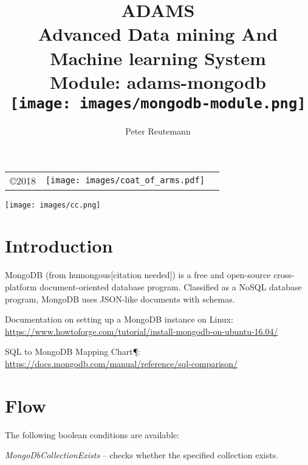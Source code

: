 \documentclass[a4paper]{book}
\title{
  \textbf{ADAMS} \\
  {\Large \textbf{A}dvanced \textbf{D}ata mining \textbf{A}nd \textbf{M}achine
  learning \textbf{S}ystem} \\
  {\Large Module: adams-mongodb} \\
  \vspace{1cm}
  \texttt{[image: images/mongodb-module.png]} \\
}
\author{
  Peter Reutemann
}
\begin{document}
\begin{titlepage}
\maketitle

\thispagestyle{empty}
\center
\begin{table}[b]
	\begin{tabular}{c l l}
		\parbox[c][2cm]{2cm}{\copyright 2018} &
		\parbox[c][2cm]{5cm}{\texttt{[image: images/coat\_of\_arms.pdf]}} \\
	\end{tabular}
	\texttt{[image: images/cc.png]} \\
\end{table}

\end{titlepage}

\tableofcontents

\chapter{Introduction}
MongoDB (from humongous[citation needed]) is a free and open-source cross-platform
document-oriented database program. Classified as a NoSQL\cite{nosql} database program,
MongoDB uses JSON-like\cite{json} documents with schemas.

\begin{tight_itemize}
  \item Documentation on setting up a MongoDB instance on Linux: \\
    \url{https://www.howtoforge.com/tutorial/install-mongodb-on-ubuntu-16.04/}{}
  \item SQL to MongoDB Mapping Chart¶: \\
    \url{https://docs.mongodb.com/manual/reference/sql-comparison/}{}
\end{tight_itemize}

\chapter{Flow}
The following boolean conditions are available:
\begin{tight_itemize}
  \item \textit{MongoDbCollectionExists} -- checks whether the specified collection exists.
\end{tight_itemize}
\end{document}
